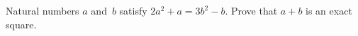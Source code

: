 \problem
Natural numbers $a$ and~$b$ satisfy $2 a^2 + a = 3 b^2 - b$.
Prove that $a + b$ is an exact square.
\solution
\endproblem
